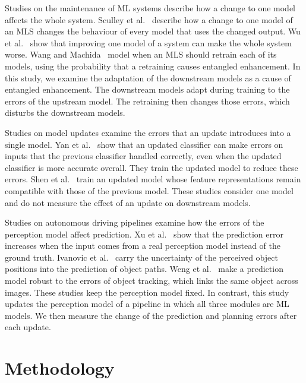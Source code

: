 \documentclass[conference]{IEEEtran}
\begin{document}
Studies on the maintenance of ML systems describe how a change to one model affects the whole system. Sculley et al.~\cite{sculley2015hidden} describe how a change to one model of an MLS changes the behaviour of every model that uses the changed output. Wu et al.~\cite{wu2021fixesthatfail} show that improving one model of a system can make the whole system worse. Wang and Machida~\cite{wang2024compsac,wang2025issre} model when an MLS should retrain each of its models, using the probability that a retraining causes entangled enhancement. In this study, we examine the adaptation of the downstream models as a cause of entangled enhancement. The downstream models adapt during training to the errors of the upstream model. The retraining then changes those errors, which disturbs the downstream models.

Studies on model updates examine the errors that an update introduces into a single model. Yan et al.~\cite{yan2021pctraining} show that an updated classifier can make errors on inputs that the previous classifier handled correctly, even when the updated classifier is more accurate overall. They train the updated model to reduce these errors. Shen et al.~\cite{shen2020bct} train an updated model whose feature representations remain compatible with those of the previous model. These studies consider one model and do not measure the effect of an update on downstream models.

Studies on autonomous driving pipelines examine how the errors of the perception model affect prediction. Xu et al.~\cite{xu2024realworld} show that the prediction error increases when the input comes from a real perception model instead of the ground truth. Ivanovic et al.~\cite{ivanovic2022propagating} carry the uncertainty of the perceived object positions into the prediction of object paths. Weng et al.~\cite{weng2022whose} make a prediction model robust to the errors of object tracking, which links the same object across images. These studies keep the perception model fixed. In contrast, this study updates the perception model of a pipeline in which all three modules are ML models. We then measure the change of the prediction and planning errors after each update.

\section{Methodology}
\end{document}
